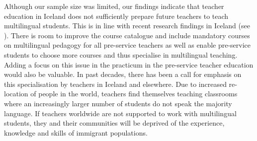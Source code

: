 \documentclass[output=paper]{langscibook}
\begin{document}
Although our sample size was limited, our findings indicate that teacher education in Iceland does not sufficiently prepare future teachers to teach multilingual students. This is in line with recent research findings in Iceland (see \citet{chapters/4_gudjonsdottir, Ministry_of_education_science_and_culture2020-3}). There is room to improve the course catalogue and include mandatory courses on multilingual pedagogy for all pre-service teachers as well as enable pre-service students to choose more courses and thus specialise in multilingual teaching. Adding a focus on this issue in the practicum in the pre-service teacher education would also be valuable. In past decades, there has been a call for emphasis on this specialisation by teachers in Iceland and elsewhere. Due to increased re-location of people in the world, teachers find themselves teaching classrooms where an increasingly larger number of students do not speak the majority language. If teachers worldwide are not supported to work with multilingual students, they and their communities will be deprived of the experience, knowledge and skills of immigrant populations.

\sloppy\printbibliography[heading=subbibliography,notkeyword=this]
\end{document}
